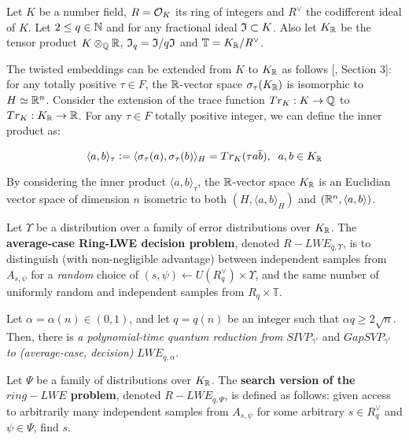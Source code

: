 \documentclass[a4paper,12pt]{article}
\begin{document}
\begin{text}
  Let $K$ be a number field, $R = \mathcal{O}_K$ its ring of integers and $R^\vee$ the
  codifferent ideal of $K$. Let $2 \leq q \in \mathbb{N}$ and for any fractional ideal $\mathfrak{I} \subset
  K$. Also let $K_{\mathbb{R}}$ be the tensor product $K \otimes_{\mathbb{Q}} \mathbb{R}$, $\mathfrak{I}_q = \mathfrak{I}/q\mathfrak{I}$
  and $\mathbb{T} = K_{\mathbb{R}}/R^\vee$.

  The twisted embeddings can be extended from $K$ to $K_{\mathbb{R}}$ as follows [\cite{Ortiz2021},
  Section 3]: for any totally positive $\tau \in F$, the $\mathbb{R}$-vector space
  $\sigma_\tau(K_{\mathbb{R}})$ is isomorphic to $H \simeq \mathbb{R}^n$. Consider the extension of the trace
  function $Tr_K : K \rightarrow \mathbb{Q}$ to $Tr_K : K_{\mathbb{R}} \rightarrow \mathbb{R}$. For any $\tau \in F$ totally
  positive integer, we can define the inner product as:

  $$
  \langle{a,b}\rangle_\tau \vcentcolon = \langle{\sigma_\tau(a), \sigma_\tau(b)}\rangle_H  = Tr_K (\tau a \overline{b}) , \;\; a,b \in K_{\mathbb{R}}
  $$

  By considering the inner product $\langle{a,b}\rangle_\tau$, the $\mathbb{R}$-vector space $K_{\mathbb{R}}$
  is an Euclidian vector space of dimension $n$ isometric to both $\left(
    H , \langle{a,b}\rangle_H  \right)$ and $\left( \mathbb{R}^n , \langle{a,b}\rangle  \right)$.
\end{text}

\begin{definition}
  \label{definition:ring-lwe-decision}
  Let $\Upsilon$ be a distribution over a family of error distributions over $K_{\mathbb{R}}$.
  The \textbf{average-case Ring-LWE decision problem}, denoted $R-LWE_{q,\Upsilon}$, is to
  distinguish (with non-negligible advantage) between independent samples from
  $A_{s, \psi}$ for a \textit{random} choice of $(s,\psi) \longleftarrow U(R_q^\vee) \times \Upsilon$, and the
  same number of uniformly random and independent samples from $R_q \times \mathbb{T}$.
\end{definition}

\begin{theorem}
  Let $\alpha = \alpha(n) \in (0, 1)$, and let $q = q(n)$ be an integer such that $\alpha q \geq 
  2\sqrt{n}$. Then, there is \emph{a polynomial-time quantum reduction from} $SIVP_{\gamma'}$
  and $GapSVP_{\gamma'}$ \emph{to (average-case, decision)} $LWE_{q,\alpha}$.
\end{theorem}

\begin{definition}
  \label{definition:ring-lwe-search}
Let $\Psi$ be a family of distributions over $K_{\mathbb{R}}$. The \textbf{search version of the $ring-LWE$ problem}, denoted $R-LWE_{q,\Psi}$, is defined as follows: given access to arbitrarily many independent samples from $A_{s,\psi}$ for some arbitrary $s \in R_q^\vee$ and $\psi \in \Psi$, find $s$.
\end{definition}
\end{document}
